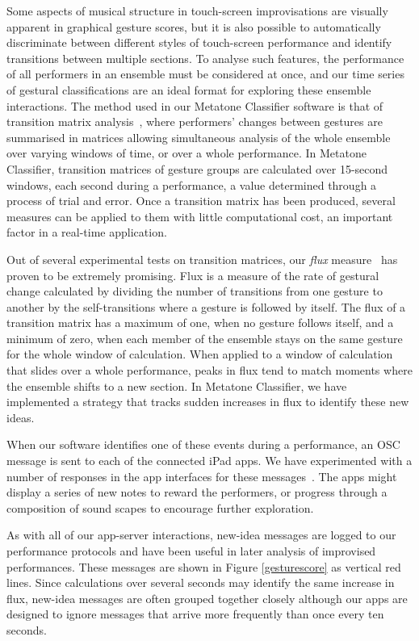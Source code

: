 \documentclass[graybox]{svmult}
\begin{document}
Some aspects of musical structure in touch-screen improvisations are
visually apparent in graphical gesture scores, but it is also possible
to automatically discriminate between different styles of touch-screen
performance and identify transitions between multiple sections. To
analyse such features, the performance of all performers in an
ensemble must be considered at once, and our time series of gestural
classifications are an ideal format for exploring these ensemble
interactions. The method used in our Metatone Classifier software is
that of transition matrix analysis~\cite{Swift:2014tya}, where
performers' changes between gestures are summarised in matrices
allowing simultaneous analysis of the whole ensemble over varying
windows of time, or over a whole performance. In Metatone Classifier,
transition matrices of gesture groups are calculated over 15-second
windows, each second during a performance, a value determined through
a process of trial and error. Once a transition matrix has been
produced, several measures can be applied to them with little
computational cost, an important factor in a real-time application.

Out of several experimental tests on transition matrices, our
\emph{flux} measure~\cite{Martin:2015jk} has proven to be extremely
promising. Flux is a measure of the rate of gestural change calculated
by dividing the number of transitions from one gesture to another by
the self-transitions where a gesture is followed by itself. The flux
of a transition matrix has a maximum of one, when no gesture follows
itself, and a minimum of zero, when each member of the ensemble stays
on the same gesture for the whole window of calculation. When applied
to a window of calculation that slides over a whole performance, peaks
in flux tend to match moments where the ensemble shifts to a new
section. In Metatone Classifier, we have implemented a strategy that
tracks sudden increases in flux to identify these new ideas.

When our software identifies one of these events during a performance,
an OSC message is sent to each of the connected iPad apps. We have
experimented with a number of responses in the app interfaces for
these messages~\cite{Martin:2015jk}. The apps might display a series
of new notes to reward the performers, or progress through a
composition of sound scapes to encourage further exploration.

As with all of our app-server interactions, new-idea messages are
logged to our performance protocols and have been useful in later
analysis of improvised performances. These messages are shown in
Figure \ref{gesturescore} as vertical red lines. Since calculations
over several seconds may identify the same increase in flux, new-idea
messages are often grouped together closely although our apps are
designed to ignore messages that arrive more frequently than once
every ten seconds. 
\end{document}
